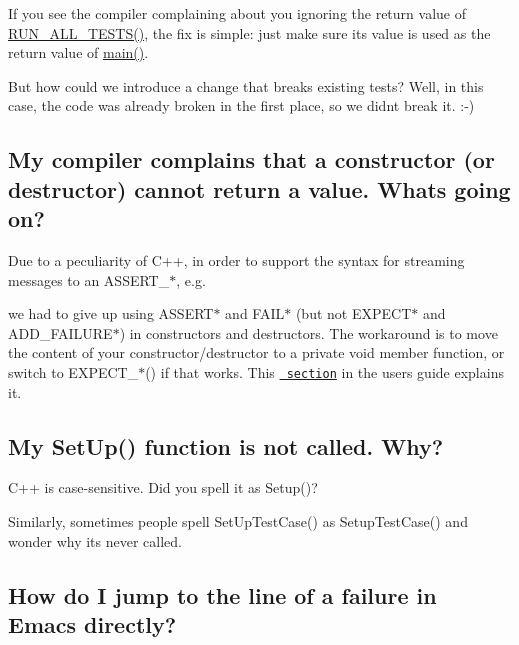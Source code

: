 If you see the compiler complaining about you ignoring the return value of {\ttfamily \mbox{\hyperlink{gtest_8h_a853a3792807489591d3d4a2f2ff9359f}{R\+U\+N\+\_\+\+A\+L\+L\+\_\+\+T\+E\+S\+T\+S()}}}, the fix is simple\+: just make sure its value is used as the return value of {\ttfamily \mbox{\hyperlink{3_814_83_2CompilerIdC_2CMakeCCompilerId_8c_a0ddf1224851353fc92bfbff6f499fa97}{main()}}}.

But how could we introduce a change that breaks existing tests? Well, in this case, the code was already broken in the first place, so we didn\textquotesingle{}t break it. \+:-\/)

\subsection*{My compiler complains that a constructor (or destructor) cannot return a value. What\textquotesingle{}s going on?}

Due to a peculiarity of C++, in order to support the syntax for streaming messages to an {\ttfamily A\+S\+S\+E\+R\+T\+\_\+$\ast$}, e.\+g.


\begin{DoxyCode}{0}
\end{DoxyCode}


we had to give up using {\ttfamily A\+S\+S\+E\+R\+T$\ast$} and {\ttfamily F\+A\+I\+L$\ast$} (but not {\ttfamily E\+X\+P\+E\+C\+T$\ast$} and {\ttfamily A\+D\+D\+\_\+\+F\+A\+I\+L\+U\+R\+E$\ast$}) in constructors and destructors. The workaround is to move the content of your constructor/destructor to a private void member function, or switch to {\ttfamily E\+X\+P\+E\+C\+T\+\_\+$\ast$()} if that works. This \href{advanced.md\#assertion-placement}{\texttt{ section}} in the user\textquotesingle{}s guide explains it.

\subsection*{My Set\+Up() function is not called. Why?}

C++ is case-\/sensitive. Did you spell it as {\ttfamily Setup()}?

Similarly, sometimes people spell {\ttfamily Set\+Up\+Test\+Case()} as {\ttfamily Setup\+Test\+Case()} and wonder why it\textquotesingle{}s never called.

\subsection*{How do I jump to the line of a failure in Emacs directly?}

